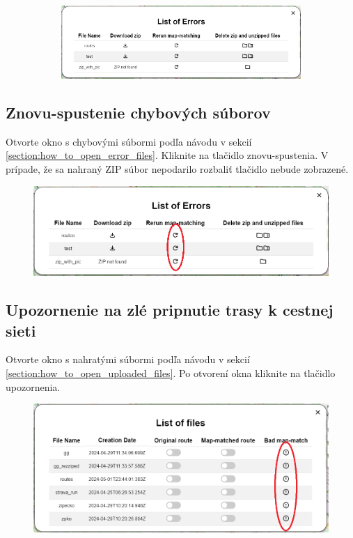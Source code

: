 \begin{figure}[H]
\begin{subfigure}{0.2\textwidth}
    \end{subfigure}
    \begin{subfigure}{.78\textwidth}
        \centering
        \includegraphics[width=1\textwidth]{guide_includes/img/errors.png}
    \end{subfigure}
\end{figure}

\subsection{Znovu-spustenie chybových súborov}
Otvorte okno s chybovými súbormi podľa návodu v sekcií \ref{section:how_to_open_error_files}. Kliknite na tlačidlo znovu-spustenia. V prípade, že sa nahraný ZIP súbor nepodarilo rozbaliť tlačidlo nebude zobrazené. 
\begin{figure}[H]
    \centering
    \includegraphics[width=1\textwidth]{guide_includes/img/rerun_map_match.png}
\end{figure}

\pagebreak
\subsection{Upozornenie na zlé pripnutie trasy k cestnej sieti}
Otvorte okno s nahratými súbormi podľa návodu v sekcií \ref{section:how_to_open_uploaded_files}. Po otvorení okna kliknite na tlačidlo upozornenia. 
\begin{figure}[H]
    \centering
    \includegraphics[width=1\textwidth]{guide_includes/img/bad_map_match_notify.png}
\end{figure}